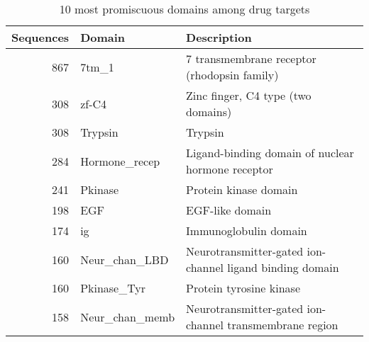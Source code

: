\begin{table}
	\begin{center}
		\sf
		\begin{tabular}{r l l}
			\textbf{Sequences} & \textbf{Domain} & \textbf{Description} \\
			\hline
			 867 & 7tm\_1          & 7 transmembrane receptor (rhodopsin family)              \\
			 308 & zf-C4          & Zinc finger, C4 type (two domains)                       \\
			 308 & Trypsin        & Trypsin                                                  \\
			 284 & Hormone\_recep  & Ligand-binding domain of nuclear hormone receptor        \\
			 241 & Pkinase        & Protein kinase domain                                    \\
			 198 & EGF            & EGF-like domain                                          \\
			 174 & ig             & Immunoglobulin domain                                    \\
			 160 & Neur\_chan\_LBD  & Neurotransmitter-gated ion-channel ligand binding domain \\
			 160 & Pkinase\_Tyr    & Protein tyrosine kinase                                  \\
			 158 & Neur\_chan\_memb & Neurotransmitter-gated ion-channel transmembrane region   \\
			\hline
		\end{tabular}
		\caption{10 most promiscuous domains among drug targets}
	\end{center}
\end{table}

